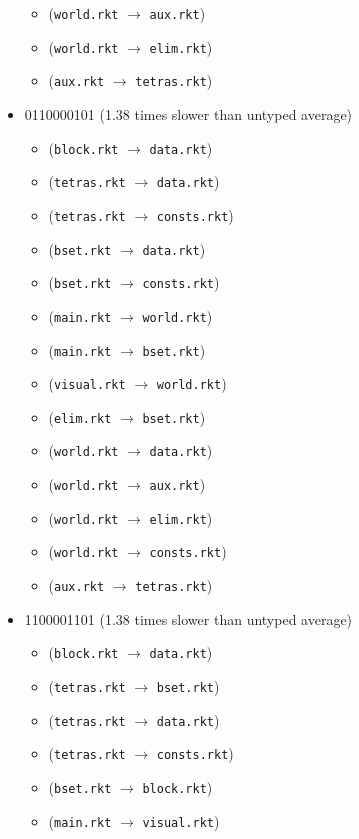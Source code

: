 \documentclass{article}
\newcommand{\mono}[1]{\texttt{#1}}
\begin{document}
\begin{itemize}
\begin{itemize}
  \item (\mono{world.rkt} $\rightarrow$ \mono{aux.rkt})
  \item (\mono{world.rkt} $\rightarrow$ \mono{elim.rkt})
  \item (\mono{aux.rkt} $\rightarrow$ \mono{tetras.rkt})
  \end{itemize}
\item 0110000101 (1.38 times slower than untyped average)
  \begin{itemize}
  \item (\mono{block.rkt} $\rightarrow$ \mono{data.rkt})
  \item (\mono{tetras.rkt} $\rightarrow$ \mono{data.rkt})
  \item (\mono{tetras.rkt} $\rightarrow$ \mono{consts.rkt})
  \item (\mono{bset.rkt} $\rightarrow$ \mono{data.rkt})
  \item (\mono{bset.rkt} $\rightarrow$ \mono{consts.rkt})
  \item (\mono{main.rkt} $\rightarrow$ \mono{world.rkt})
  \item (\mono{main.rkt} $\rightarrow$ \mono{bset.rkt})
  \item (\mono{visual.rkt} $\rightarrow$ \mono{world.rkt})
  \item (\mono{elim.rkt} $\rightarrow$ \mono{bset.rkt})
  \item (\mono{world.rkt} $\rightarrow$ \mono{data.rkt})
  \item (\mono{world.rkt} $\rightarrow$ \mono{aux.rkt})
  \item (\mono{world.rkt} $\rightarrow$ \mono{elim.rkt})
  \item (\mono{world.rkt} $\rightarrow$ \mono{consts.rkt})
  \item (\mono{aux.rkt} $\rightarrow$ \mono{tetras.rkt})
  \end{itemize}
\item 1100001101 (1.38 times slower than untyped average)
  \begin{itemize}
  \item (\mono{block.rkt} $\rightarrow$ \mono{data.rkt})
  \item (\mono{tetras.rkt} $\rightarrow$ \mono{bset.rkt})
  \item (\mono{tetras.rkt} $\rightarrow$ \mono{data.rkt})
  \item (\mono{tetras.rkt} $\rightarrow$ \mono{consts.rkt})
  \item (\mono{bset.rkt} $\rightarrow$ \mono{block.rkt})
  \item (\mono{main.rkt} $\rightarrow$ \mono{visual.rkt})

\end{itemize}
\end{itemize}
\end{document}
